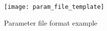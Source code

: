 \begin{figure}[h]
	\centering
	\texttt{[image: param\_file\_template]}
	\caption{Parameter file format example}
	\label{fig:parameter}
\end{figure}







